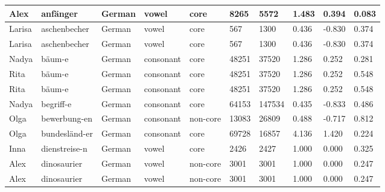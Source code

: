 \begin{longtable}{|p{1.2cm}|p{3cm}|p{1cm}|p{1.5cm}|p{1.5cm}|R{1.2cm}|R{1cm}|R{1cm}|R{0.8cm}|R{0.8cm}|}
Alex      & anf\"{a}nger           & German        & vowel            & core      & 8265         & 5572           & 1.483                 & 0.394             & 0.083        \\ \hline
Larisa    & aschenbecher           & German        & vowel            & core      & 567          & 1300           & 0.436                 & -0.830            & 0.374        \\ \hline
Larisa    & aschenbecher           & German        & vowel            & core      & 567          & 1300           & 0.436                 & -0.830            & 0.374        \\ \hline
Nadya     & b\"{a}um-e             & German        & consonant        & core      & 48251        & 37520          & 1.286                 & 0.252             & 0.281        \\ \hline
Rita      & b\"{a}um-e             & German        & consonant        & core      & 48251        & 37520          & 1.286                 & 0.252             & 0.548        \\ \hline
Rita      & b\"{a}um-e             & German        & consonant        & core      & 48251        & 37520          & 1.286                 & 0.252             & 0.548        \\ \hline
Nadya     & begriff-e              & German        & consonant        & core      & 64153        & 147534         & 0.435                 & -0.833            & 0.486        \\ \hline
Olga      & bewerbung-en           & German        & consonant        & non-core  & 13083        & 26809          & 0.488                 & -0.717            & 0.812        \\ \hline
Olga      & bundesl\"{a}nd-er      & German        & consonant        & core      & 69728        & 16857          & 4.136                 & 1.420             & 0.224        \\ \hline
Inna      & dienstreise-n          & German        & vowel            & core      & 2426         & 2427           & 1.000                 & 0.000             & 0.325        \\ \hline
Alex      & dinosaurier            & German        & vowel            & non-core  & 3001         & 3001           & 1.000                 & 0.000             & 0.247        \\ \hline
Alex      & dinosaurier            & German        & vowel            & non-core  & 3001         & 3001           & 1.000                 & 0.000             & 0.247        \\ \hline

\end{longtable}

